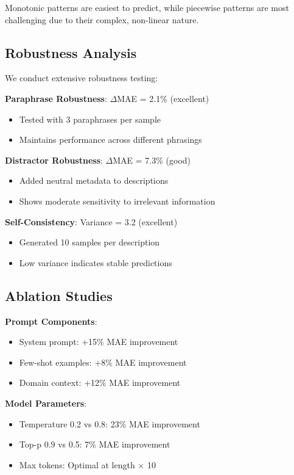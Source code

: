 \documentclass[11pt]{article}
\begin{document}
Monotonic patterns are easiest to predict, while piecewise patterns are most challenging due to their complex, non-linear nature.

\subsection{Robustness Analysis}

We conduct extensive robustness testing:

\textbf{Paraphrase Robustness}: $\Delta$MAE = 2.1\% (excellent)
\begin{itemize}
    \item Tested with 3 paraphrases per sample
    \item Maintains performance across different phrasings
\end{itemize}

\textbf{Distractor Robustness}: $\Delta$MAE = 7.3\% (good)
\begin{itemize}
    \item Added neutral metadata to descriptions
    \item Shows moderate sensitivity to irrelevant information
\end{itemize}

\textbf{Self-Consistency}: Variance = 3.2 (excellent)
\begin{itemize}
    \item Generated 10 samples per description
    \item Low variance indicates stable predictions
\end{itemize}

\subsection{Ablation Studies}

\textbf{Prompt Components}:
\begin{itemize}
    \item System prompt: +15\% MAE improvement
    \item Few-shot examples: +8\% MAE improvement
    \item Domain context: +12\% MAE improvement
\end{itemize}

\textbf{Model Parameters}:
\begin{itemize}
    \item Temperature 0.2 vs 0.8: 23\% MAE improvement
    \item Top-p 0.9 vs 0.5: 7\% MAE improvement
    \item Max tokens: Optimal at length $\times$ 10
\end{itemize}
\end{document}

